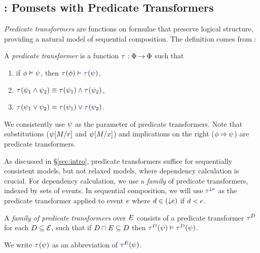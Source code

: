 \subsection{\PwTTITLE: Pomsets with Predicate Transformers}
\label{sec:pomsets}

\emph{Predicate transformers} are functions on formulae that preserve
logical structure, providing a natural model of sequential composition.
The definition comes from \citet{DBLP:journals/cacm/Dijkstra75}:

\begin{definition}
  \label{def:trans}
  A \emph{predicate transformer} is a %
  function
  $\aTr{}{}:\Formulae\fun\Formulae$ such that
  \begin{multicols}{2}
    \begin{enumerate}[,label=(\textsc{x}\arabic*),ref=\textsc{x}\arabic*]
    \item \label{tr-implies}
      if $\phi \mathrel{\vDash} \psi$, then $\aTr{}{\aForm} \rimplies
      \aTr{}{\bForm}$,
    \item \label{tr-and}
      $\aTr{}{\bForm_1\land\bForm_2}\riff\aTr{}{\bForm_1}\land\aTr{}{\bForm_2}$,    
    \item \label{tr-or}
      $\aTr{}{\bForm_1\lor\bForm_2}\riff\aTr{}{\bForm_1}\lor\aTr{}{\bForm_2}$.
    \end{enumerate}
  \end{multicols}
\end{definition}
\noindent
We consistently use $\psi$ as the parameter of predicate transformers.
Note that substitutions ($\psi[M/r]$ and $\psi[M/x]$) and
implications on the right ($\phi\mathbin{\Rightarrow}\psi$) are predicate
transformers.

As discussed in \S\ref{sec:intro}, predicate transformers suffice for
sequentially consistent models, but not relaxed models, where dependency
calculation is crucial.  For dependency calculation, we use a \emph{family}
of predicate transformers, indexed by sets of events. In sequential
composition, we will use $\aTr{\Cdown{\aEv}}{}$ as the predicate transformer
applied to event $e$ where $d\in(\smash{\downarrow}e)$ if $d<e$.

\begin{definition}
  \label{def:family}
  A \emph{family of predicate transformers} over $E$ consists of a
  predicate transformer $\aTr{\bEvs}{}$ for each $D\subseteq\mathcal{E}$,
  such that if $D \cap E \subseteq D$ then $\aTr{\cEvs}{\bForm}
  \rimplies \aTr{\bEvs}{\bForm}$.

  We write $\aTr{}{\bForm}$ as an abbreviation of $\aTr{\aEvs}{\bForm}$.
\end{definition}

